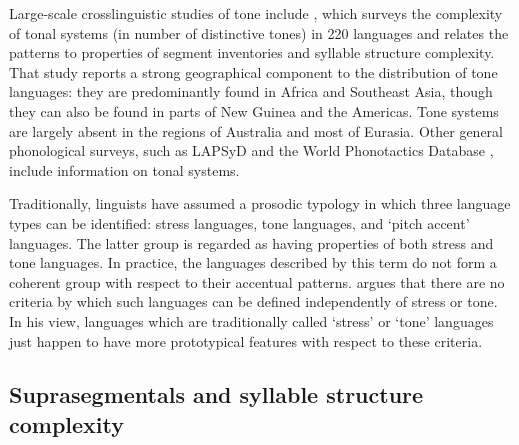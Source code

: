   Large-scale crosslinguistic studies of tone include \citet{Maddieson2013d}, which surveys the complexity of tonal systems (in number of distinctive tones) in 220 languages and relates the patterns to properties of segment inventories and syllable structure complexity. That study reports a strong geographical component to the distribution of tone languages: they are predominantly found in Africa and Southeast Asia, though they can also be found in parts of New Guinea and the Americas. Tone systems are largely absent in the regions of Australia and most of Eurasia. Other general phonological surveys, such as LAPSyD \citep{MaddiesonEtAl2013} and the World Phonotactics Database \citep{DonohueEtAl2013}, include information on tonal systems.

  Traditionally, linguists have assumed a prosodic typology in which three language types can be identified: stress languages, tone languages, and ‘pitch accent’ languages. The latter group is regarded as having properties of both stress and tone languages. In practice, the languages described by this term do not form a coherent group with respect to their accentual patterns. \citet{Hyman2009} argues that there are no criteria by which such languages can be defined independently of stress or tone. In his view, languages which are traditionally called ‘stress’ or ‘tone’ languages just happen to have more prototypical features with respect to these criteria.

\subsection{Suprasegmentals and syllable structure complexity}\label{sec:5.1.2}

